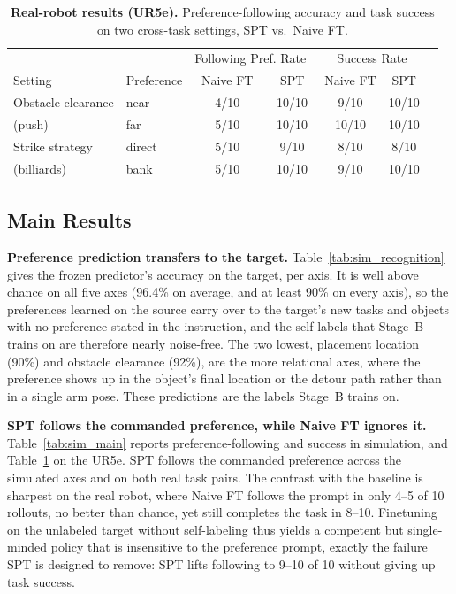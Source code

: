 \documentclass{article}
\begin{document}
\begin{table}[t]
  \centering
  \small
  \caption{\textbf{Real-robot results (UR5e).} Preference-following accuracy and
  task success on two cross-task settings, SPT vs.\ Naive FT. }
  \label{tab:real_main}
  \begin{tabular}{llccccc}
    \hline
    & & \multicolumn{2}{c}{Following Pref. Rate\ } & \multicolumn{2}{c}{Success Rate} \\
    Setting & Preference & Naive FT & SPT & Naive FT & SPT \\
    \hline
    Obstacle clearance & near    & 4/10 & 10/10 & 9/10 & 10/10 \\
    (push)             & far     & 5/10 & 10/10 & 10/10 & 10/10 \\
    Strike strategy    & direct  & 5/10 & 9/10 & 8/10 & 8/10 \\
    (billiards)        & bank    & 5/10 & 10/10 & 9/10 & 10/10 \\
    \hline
  \end{tabular}
\end{table}

\subsection{Main Results}
\label{sec:exp-main}

\textbf{Preference prediction transfers to the target.}
Table~\ref{tab:sim_recognition} gives the frozen predictor's accuracy on the
target, per axis. It is well above chance on all five axes (96.4\% on average,
and at least 90\% on every axis), so the preferences learned on the source carry
over to the target's new tasks and objects with no preference stated in the
instruction, and the self-labels that Stage~B trains on are therefore nearly
noise-free. The two lowest, placement location (90\%) and obstacle clearance
(92\%), are the more relational axes, where the preference shows up in the
object's final location or the detour path rather than in a single arm pose.
These predictions are the labels Stage~B trains on.

\textbf{SPT follows the commanded preference, while Naive FT ignores it.}
Table~\ref{tab:sim_main} reports preference-following and success in simulation,
and Table~\ref{tab:real_main} on the UR5e. SPT follows the commanded preference
across the simulated axes and on both real task pairs. The contrast with the
baseline is sharpest on the real robot, where Naive FT follows the prompt in only
4--5 of 10 rollouts, no better than chance, yet still completes the task in 8--10.
Finetuning on the unlabeled target without self-labeling thus yields a competent
but single-minded policy that is insensitive to the preference prompt, exactly the
failure SPT is designed to remove: SPT lifts following to 9--10 of 10 without
giving up task success. 
\end{document}
